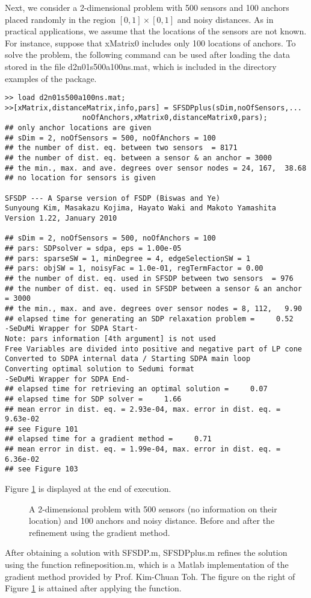 \documentclass[12pt]{article}
\begin{document}
Next, we consider a 2-dimensional  problem with 500 sensors and 100 anchors placed 
randomly in the region $[0,1] \times [0,1]$ and noisy distances.  As in practical applications, we assume that
the locations of the sensors are not known.  For instance, suppose that 
xMatrix0 includes only 100 locations of anchors. To solve the 
problem, the following command can be used after loading the data stored in the file
d2n01s500a100ns.mat, which is included in the directory examples of the package. 
\begin{verbatim}
>> load d2n01s500a100ns.mat;
>>[xMatrix,distanceMatrix,info,pars] = SFSDPplus(sDim,noOfSensors,...
                  noOfAnchors,xMatrix0,distanceMatrix0,pars);
## only anchor locations are given
## sDim = 2, noOfSensors = 500, noOfAnchors = 100
## the number of dist. eq. between two sensors  = 8171
## the number of dist. eq. between a sensor & an anchor = 3000
## the min., max. and ave. degrees over sensor nodes = 24, 167,  38.68
## no location for sensors is given

SFSDP --- A Sparse version of FSDP (Biswas and Ye)
Sunyoung Kim, Masakazu Kojima, Hayato Waki and Makoto Yamashita
Version 1.22, January 2010

## sDim = 2, noOfSensors = 500, noOfAnchors = 100
## pars: SDPsolver = sdpa, eps = 1.00e-05
## pars: sparseSW = 1, minDegree = 4, edgeSelectionSW = 1
## pars: objSW = 1, noisyFac = 1.0e-01, regTermFactor = 0.00
## the number of dist. eq. used in SFSDP between two sensors  = 976
## the number of dist. eq. used in SFSDP between a sensor & an anchor = 3000
## the min., max. and ave. degrees over sensor nodes = 8, 112,   9.90
## elapsed time for generating an SDP relaxation problem =     0.52
-SeDuMi Wrapper for SDPA Start-
Note: pars information [4th argument] is not used
Free Variables are divided into positive and negative part of LP cone
Converted to SDPA internal data / Starting SDPA main loop
Converting optimal solution to Sedumi format
-SeDuMi Wrapper for SDPA End-
## elapsed time for retrieving an optimal solution =     0.07
## elapsed time for SDP solver =     1.66
## mean error in dist. eq. = 2.93e-04, max. error in dist. eq. = 9.63e-02
## see Figure 101
## elapsed time for a gradient method =     0.71
## mean error in dist. eq. = 1.99e-04, max. error in dist. eq. = 6.36e-02
## see Figure 103
\end{verbatim}
Figure \ref{EG1NS} is displayed at the end of execution.
\begin{figure}
  \hspace{1mm}
\caption{A 2-dimensional  problem with 500 sensors  (no information on their location) and 100 anchors and noisy distance. 
Before and after the refinement using the gradient method.}
\label{EG1NS}
\end{figure}
After obtaining a solution with SFSDP.m, SFSDPplus.m refines the solution using 
the function refineposition.m, 
which is a Matlab implementation of the gradient method provided by Prof. Kim-Chuan Toh.
The figure on the right of Figure \ref{EG1NS} is attained after applying the function. 
\end{document}

